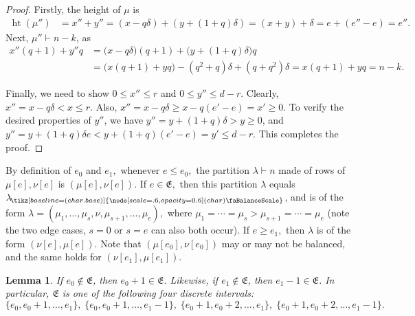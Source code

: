 \documentclass[12pt,dvipsnames,accepted=2016-08-18,a4paper,onecolumn]{quantumarticle}
\def\la{\lambda}
\DeclareMathOperator{\het}{ht}
\def\la{\lambda}
\def\bal{\tikz[baseline=(char.base)]{
  \node[scale=.6,opacity=0.6] (char) {\faBalanceScale}}
}
\def\lab{\lambda_{\!\bal}}
\numberwithin{equation}{section}
\newtheorem{lemma}[theorem]{Lemma}
\theoremstyle{definition}
\begin{document}
\begin{proof}
 Firstly, the height of $\mu$ is
    \begin{align*}
    \het(\mu'') & =
        x'' + y'' = (x - q \delta) + (y + (1+q) \delta ) = (x+y) +\delta  = e + (e'' - e) = e''.
    \end{align*}
Next, $\mu''\vdash n-k$, as
    \begin{align*}
        x''(q+1) + y''q &= \big(x - q \delta \big)(q+1) + \big(y + (1+q) \delta\big) q\\  &= \big(x(q+1) + yq\big) - (q^2+q)\delta + (q+q^2)\delta = x(q+1) + yq = n-k.
    \end{align*}
    
Finally, we need to show $0 \le x'' \le r$ and $0 \le y'' \le d-r$. Clearly, 
     $x'' = x - q \delta < x \leq r$. 
  Also, $x'' = x - q \delta \ge x - q(e' - e) = x' \geq 0$.
To verify the desired properties of $y''$, we have
$y'' = y + (1+q)\delta > y\geq0$, and
$y'' = y + (1+q)\delta e < y + (1+q)(e' - e) = y'\leq d-r$.  This completes the proof.
\end{proof}

By definition of $e_0$ and $e_1,$ whenever $e \leq e_0,$ the partition $\lambda\vdash n$ made of rows of $\mu[e],\nu[e]$ is $(\mu[e], \nu[e])$. If $e \in \mathfrak{E},$ then this partition $\la$ equals $\lab$, and is of the form
    $\la=(\mu_1,\ldots,\mu_s,\nu,\mu_{s+1},\ldots,\mu_e),$
where $\mu_1=\cdots=\mu_s>\mu_{s+1}=\cdots=\mu_e$
(note the two edge cases, $s=0$ or $s=e$ can also both occur). 
If $e\geq e_1,$ then $\la$ is of the form $(\nu[e], \mu[e]).$  Note that $(\mu[e_0], \nu[e_0])$
may or may not be balanced, and the same holds for $(\nu[e_1], \mu[e_1]).$ 
 
\begin{lemma}\label{lem:frakinterval+}
If $e_0\not\in\mathfrak E$, then $e_0+1\in\mathfrak E$.
Likewise, if $e_1\not\in\mathfrak E$, then $e_1-1\in\mathfrak E$. In particular, $\mathfrak E$ is one of the following four discrete intervals:
\[
    \{e_0,e_0+1,\ldots,e_1\},
    \;
    \{e_0,e_0+1,\ldots,e_1-1\},
    \;
    \{e_0+1,e_0+2,\ldots,e_1\},
    \;
    \{e_0+1,e_0+2,\ldots,e_1-1\}.
\]
\end{lemma}
\end{document}
